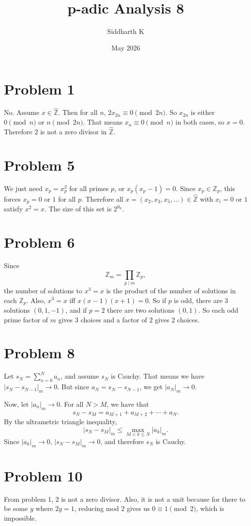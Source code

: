\documentclass{article}
\title{p-adic Analysis 8}
\author{Siddharth K}
\date{May 2026}
\newcommand{\Z}{\mathbb{Z}}
\newcommand{\Zhat}{\widehat{\Z}}
\begin{document}
\maketitle

\section*{Problem 1}
No. Assume $x \in \Zhat$. Then for all $n$, $2x_{2n} \equiv 0 \pmod{2n}$. So $x_{2n}$ is either $0 \pmod{n}$ or $n \pmod{2n}$. That means $x_n \equiv 0 \pmod{n}$ in both cases, so $x = 0$. Therefore $2$ is not a zero divisor in $\Zhat$.

\section*{Problem 5}
We just need $x_p = x_p^2$ for all primes $p$, or $x_p(x_p - 1) = 0$. Since $x_p \in \Z_p$, this forces $x_p = 0$ or $1$ for all $p$. Therefore all $x = (x_2, x_3, x_5, \ldots) \in \Zhat$ with $x_i = 0$ or $1$ satisfy $x^2 = x$. The size of this set is $2^{\aleph_0}$.

\section*{Problem 6}
Since
$$\Z_m = \prod_{p \mid m} \Z_p,$$
the number of solutions to $x^3 = x$ is the product of the number of solutions in each $\Z_p$. Also, $x^3 = x$ iff $x(x - 1)(x + 1) = 0$. So if $p$ is odd, there are $3$ solutions $(0, 1, -1)$, and if $p = 2$ there are two solutions $(0, 1)$. So each odd prime factor of $m$ gives $3$ choices and a factor of $2$ gives $2$ choices.

\section*{Problem 8}
Let $s_N = \sum_{n = 0}^N a_n$, and assume $s_N$ is Cauchy. That means we have $|s_N - s_{N - 1}|_m \to 0$. But since $a_N = s_N - s_{N - 1}$, we get $|a_N|_m \to 0$.

Now, let $|a_n|_m \to 0$. For all $N > M$, we have that
$$s_N - s_M = a_{M + 1} + a_{M + 2} + \cdots + a_N.$$
By the ultrametric triangle inequality,
$$|s_N - s_M|_m \le \max_{M < k \le N} |a_k|_m.$$
Since $|a_k|_m \to 0$, $|s_N - s_M|_m \to 0$, and therefore $s_N$ is Cauchy.

\section*{Problem 10}
From problem 1, $2$ is not a zero divisor. Also, it is not a unit because for there to be some $y$ where $2y = 1$, reducing mod $2$ gives us $0 \equiv 1 \pmod{2}$, which is impossible.
\end{document}

